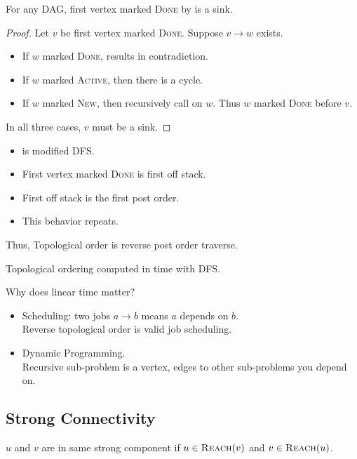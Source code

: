 \begin{lemma}
    For any DAG, first vertex marked \textsc{Done} by
     is a sink.
\end{lemma}
\begin{proof}
    Let $v$ be first vertex marked \textsc{Done}. Suppose $v \rightarrow w$ exists.
    \begin{itemize}
        \item If $w$ marked \textsc{Done}, results in contradiction.
        \item If $w$ marked \textsc{Active}, then there is a cycle.
        \item If $w$ marked \textsc{New}, then recursively call on $w$.
            Thus $w$ marked \textsc{Done} before $v$.
    \end{itemize}
    In all three cases, $v$ must be a sink.
\end{proof}

\observation
\begin{itemize}
    \item {} is modified DFS.
    \item First vertex marked \textsc{Done} is first off stack.
    \item First off stack is the first post order.
    \item This behavior repeats.
\end{itemize}
Thus, Topological order is reverse post order traverse.

Topological ordering computed in  time with DFS.

Why does linear time matter?
\begin{itemize}[label={-}]
    \item Scheduling: two jobs $a \rightarrow b$ means
        $a$ depends on $b$.\\
        Reverse topological order is valid job scheduling.
    \item Dynamic Programming.\\
        Recursive sub-problem is a vertex, edges to other sub-problems
        you depend on.
\end{itemize}

\subsection{Strong Connectivity}
$u$ and $v$ are in same strong component if $u \in \textsc{Reach} (v)$
and $v \in \textsc{Reach} (u)$.

